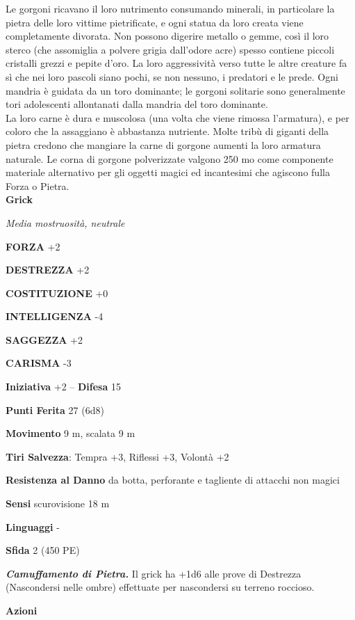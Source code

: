 \begin{multicols}{2}
Le gorgoni ricavano il loro nutrimento consumando minerali, in particolare la pietra delle loro vittime pietrificate, e ogni statua da loro creata viene completamente divorata. Non possono digerire metallo o gemme, così il loro sterco (che assomiglia a polvere grigia dall'odore acre) spesso contiene piccoli cristalli grezzi e pepite d'oro. La loro aggressività verso tutte le altre creature fa sì che nei loro pascoli siano pochi, se non nessuno, i predatori e le prede. Ogni mandria è guidata da un toro dominante; le gorgoni solitarie sono generalmente tori adolescenti allontanati dalla mandria del toro dominante.\\

La loro carne è dura e muscolosa (una volta che viene rimossa l'armatura), e per coloro che la assaggiano è abbastanza nutriente. Molte tribù di giganti della pietra credono che mangiare la carne di gorgone aumenti la loro armatura naturale. Le corna di gorgone polverizzate valgono 250 mo come componente materiale alternativo per gli oggetti magici ed incantesimi che agiscono fulla Forza o Pietra.\\


\medskip{}\textbf{Grick}

\emph{Media mostruosità, neutrale}

\textbf{FORZA} +2

\textbf{DESTREZZA} +2

\textbf{COSTITUZIONE} +0

\textbf{INTELLIGENZA} -4

\textbf{SAGGEZZA} +2

\textbf{CARISMA} -3

\textbf{Iniziativa} +2 -- \textbf{Difesa} 15

\textbf{Punti Ferita} 27 (6d8)

\textbf{Movimento} 9 m, scalata 9 m

\textbf{Tiri Salvezza}: Tempra +3, Riflessi +3, Volontà +2

\textbf{Resistenza al Danno} da botta, perforante e tagliente di attacchi non magici

\textbf{Sensi} scurovisione 18 m

\textbf{Linguaggi} -

\textbf{Sfida} 2 (450 PE)

\emph{\textbf{Camuffamento di Pietra.}} Il grick ha +1d6 alle prove di Destrezza (Nascondersi nelle ombre) effettuate per nascondersi su terreno roccioso.

\textbf{Azioni}


\end{multicols}
